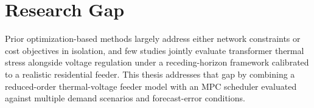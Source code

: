 \section{Research Gap}
Prior optimization-based methods largely address either network constraints or cost objectives
in isolation, and few studies jointly evaluate transformer thermal stress alongside voltage
regulation under a receding-horizon framework calibrated to a realistic residential feeder.
This thesis addresses that gap by combining a reduced-order thermal-voltage feeder model with
an MPC scheduler evaluated against multiple demand scenarios and forecast-error conditions.

